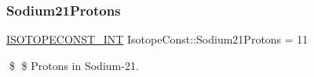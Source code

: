 \subsubsection{\texorpdfstring{Sodium21\+Protons}{Sodium21Protons}}
{\footnotesize\ttfamily \mbox{\hyperlink{group___isotope_const-_macros_ga5f18360b3e99483a35c32d789e62621c}{I\+S\+O\+T\+O\+P\+E\+C\+O\+N\+S\+T\+\_\+\+I\+NT}} Isotope\+Const\+::\+Sodium21\+Protons = 11}

\$ \$ Protons in Sodium-\/21. 